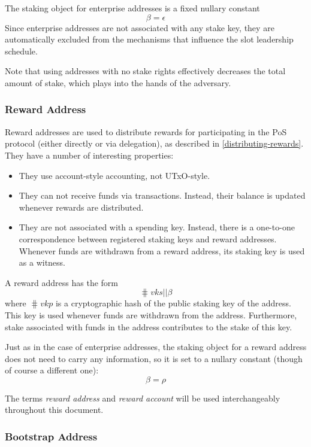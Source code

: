 \documentclass[11pt,a4paper]{article}
\begin{document}
The staking object for enterprise addresses is a fixed nullary constant
\[
\beta = \epsilon
\]
Since enterprise addresses are not associated with any stake key, they
are automatically excluded from the mechanisms that influence the slot
leadership schedule.

Note that using addresses with no stake rights effectively decreases
the total amount of stake, which plays into the hands of the adversary.

\subsubsection{Reward Address}
\label{reward-address}

Reward addresses are used to distribute rewards for participating in
the PoS protocol (either directly or via delegation), as described in
\ref{distributing-rewards}. They have a number of interesting
properties:

\begin{itemize}
\item They use account-style accounting, not UTxO-style.
\item They can not receive funds via transactions. Instead, their
  balance is updated whenever rewards are distributed.
\item They are not associated with a spending key. Instead, there is a
  one-to-one correspondence between registered staking keys and reward
  addresses. Whenever funds are withdrawn from a reward address, its
  staking key is used as a witness.
\end{itemize}

A reward address has the form
\[
\hash{vks} \mathbin{||} \beta
\]
where \(\hash{vkp}\) is a cryptographic hash of the public staking key
of the address. This key is used whenever funds are withdrawn from the
address. Furthermore, stake associated with funds in the address
contributes to the stake of this key.

Just as in the case of enterprise addresses, the staking object for a reward
address does not need to carry any information, so it is set to a
nullary constant (though of course a different one):
\[
\beta = \rho
\]

The terms \emph{reward address} and \emph{reward account} will be used
interchangeably throughout this document.

\subsubsection{Bootstrap Address}
\label{bootstrap-address}
\end{document}
